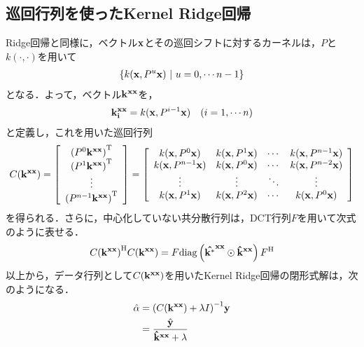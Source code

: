 \documentclass[11pt,a4j]{jarticle}
\begin{document}
    \subsection{巡回行列を使ったKernel Ridge回帰}
      Ridge回帰と同様に，ベクトル${\bf x}$とその巡回シフトに対するカーネルは，$P$と$k(\cdot,\cdot)$を用いて
      \begin{align}
        \left\{ k({\bf x}, {P}^{u}{\bf x}) ~|~ u=0,\cdots n-1 \right\} 
      \end{align}
      となる．よって，ベクトル${\bf {k}^{xx}}$を，
      \begin{align}
        {\bf k^{xx}_{i}} = k({\bf x}, {P}^{i-1}{\bf x}) ~~~ (i=1,\cdots n)
      \end{align}
      と定義し，これを用いた巡回行列
      \begin{align}
        C({\bf k^{xx}}) = 
        \left[
          \begin{array}{c}
            {({P}^{0} {\bf k^{xx}})}^{\mathrm{T}} \\
            {({P}^{1} {\bf k^{xx}})}^{\mathrm{T}} \\
            \vdots \\
            {({P}^{n-1} {\bf k^{xx}})}^{\mathrm{T}} 
          \end{array}
        \right]
        = 
        \left[
          \begin{array}{cccc}
            k({\bf x}, P^{0}{\bf x}) & k({\bf x}, P^{1}{\bf x}) & \cdots & k({\bf x}, P^{n-1}{\bf x}) \\
            k({\bf x}, P^{n-1}{\bf x}) & k({\bf x}, P^{0}{\bf x}) & \cdots & k({\bf x}, P^{n-2}{\bf x}) \\
            \vdots&\vdots&\ddots&\vdots \\
            k({\bf x}, P^{1}{\bf x}) & k({\bf x}, P^{2}{\bf x}) &  \cdots & k({\bf x}, P^{0}{\bf x}) 
          \end{array}
        \right]
      \end{align}
      を得られる．さらに，中心化していない共分散行列は，DCT行列$F$を用いて次式のように表せる．
      \begin{align}
        {C( {\bf {k}^{xx}} ) }^{\mathrm{H}} C( {\bf {k}^{xx}} ) = F {\rm diag} \left( {\bf {\hat{k^*}}^{xx}} \odot {\bf {\hat{k}}^{xx} } \right) {F}^{\mathrm{H}} 
      \end{align}
      以上から，データ行列として$C({\bf {k}^{xx}})$を用いたKernel Ridge回帰の閉形式解は，次のようになる．
      \begin{align}
        \hat{\bf \alpha} &= { ( C( {\bf {k}^{xx}} ) + \lambda I ) }^{-1} {\bf y} \\
                &= \frac{\hat{\bf y}}{ {\bf {\hat{k}}^{xx} } + \lambda }
      \end{align}
\end{document}
